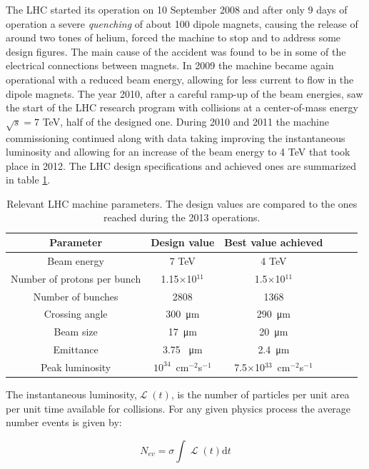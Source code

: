 The LHC started its operation on 10 September 2008 and after only 9 days of operation a severe \emph{quenching} of about 100 dipole magnets, causing the release of around two tones of helium, forced the machine to stop and to address some design figures. The main cause of the accident was found to be in some of the electrical connections between magnets. In 2009 the machine became again operational with a reduced beam energy, allowing for less current to flow in the dipole magnets. The year 2010, after a careful ramp-up of the beam energies, saw the start of the LHC research program with collisions at a center-of-mass energy $\sqrt{s} = 7$ TeV, half of the designed one. During 2010 and 2011 the machine commissioning continued along with data taking improving the instantaneous luminosity and allowing for an increase of the beam energy to 4 TeV that took place in 2012. The LHC design specifications and achieved ones are summarized in table \ref{tab:lhc_figures}.

\begin{table}[h!]
   \centering
\begin{tabular}{c|ccccc}
\hline
Parameter & Design value&  Best value achieved \\ 
\hline
Beam energy   & 7 TeV & 4 TeV \\ 
Number of protons per bunch & 1.15$\times$10$^{11}$ & 1.5$\times$10$^{11}$ \\
Number of bunches & 2808 & 1368 \\
Crossing angle & 300~\si{\micro\metre} & 290~\si{\micro\metre} \\
Beam size & 17~\si{\micro\metre} & 20~\si{\micro\metre} \\
Emittance & 3.75 ~\si{\micro\metre} & 2.4~\si{\micro\metre}  \\
Peak luminosity & $10^{34}$~cm$^{-2}$s$^{-1}$ & 7.5$\times$10$^{33}$~cm$^{-2}$s$^{-1}$ \\
\hline
\end{tabular}
  \caption{Relevant LHC machine parameters. The design values are compared to the ones reached during the 2013 operations.}
  \label{tab:lhc_figures}                
\end{table}


The instantaneous luminosity,$\operatorname{\mathcal{L}}(t)$, is the number of particles per unit area per unit time available for collisions. For any given physics process the average number events is given by:

\begin{equation} 
	N_{ev} = \sigma\int\operatorname{\mathcal{L}}(t)\mathrm{d}t
	\label{eq:n_events}
\end{equation} 

